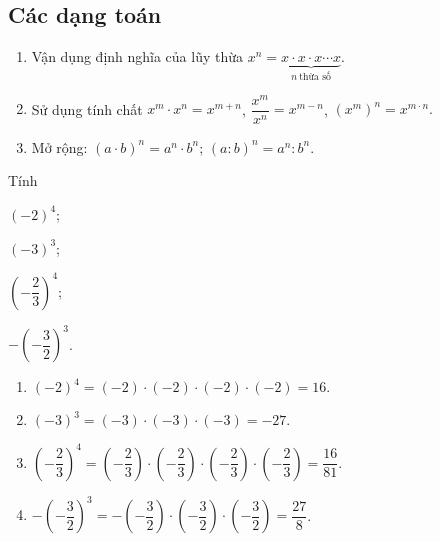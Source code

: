 \subsection{Các dạng toán}
\begin{dang}
	\begin{enumerate}[\tickEX] 
		\item Vận dụng định nghĩa của lũy thừa $x^n = \underbrace{x\cdot x \cdot x \cdots x}_{n \ \text{thừa số}}  $.
		\item Sử dụng tính chất $ x^m \cdot x^n = x^{m+n} $, $\dfrac{x^m}{x^n}=x^{m-n} $, $ \left(x^m\right)^n = x^{m \cdot n}. $
		\item Mở rộng: $ (a\cdot b)^n = a^n \cdot b^n $; $ (a:b)^n = a^n : b^n. $
	\end{enumerate}
 \end{dang}
\begin{vd}
Tính
\begin{listEX}[4]
	\item $ (-2)^4 $;
	\item $ (-3)^3 $;
	\item $ \left(-\dfrac{2}{3}\right)^4 $;
	\item $ -\left(-\dfrac{3}{2}\right)^3 $.
\end{listEX}
\loigiai
{\begin{enumerate}
		\item $ (-2)^4 =(-2)\cdot (-2)\cdot (-2)\cdot (-2) = 16.$
		\item $ (-3)^3 =(-3)\cdot (-3)\cdot (-3) = -27.$
		\item $ \left(-\dfrac{2}{3}\right)^4 =\left(-\dfrac{2}{3}\right) \cdot \left(-\dfrac{2}{3}\right) \cdot \left(-\dfrac{2}{3}\right) \cdot \left(-\dfrac{2}{3}\right) = \dfrac{16}{81}. $
		\item $ -\left(-\dfrac{3}{2}\right)^3 = -\left(-\dfrac{3}{2}\right) \cdot \left(-\dfrac{3}{2}\right) \cdot \left(-\dfrac{3}{2}\right) = \dfrac{27}{8}$.
	\end{enumerate}
}
\end{vd}
